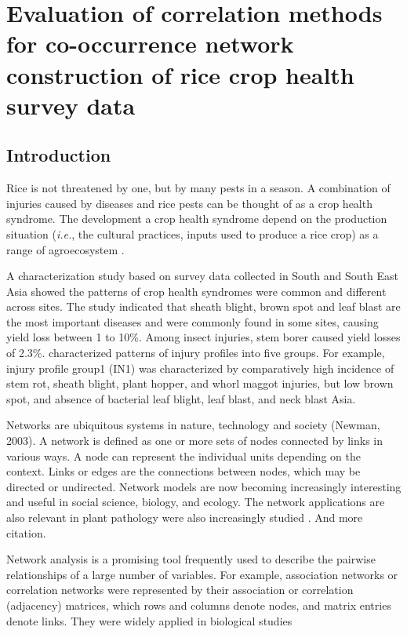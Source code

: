 \section{Evaluation of correlation methods for co-occurrence network construction of rice crop health survey data}

\subsection{Introduction}

Rice is not threatened by one, but by many pests in a season. A combination of injuries caused by diseases and rice pests can be thought of as a crop health syndrome. The development a crop health syndrome depend on the production situation (\textit{i.e.}, the cultural practices, inputs used to produce a rice crop) as a range of agroecosystem \citep{Savary_2006_Quantification}.

A characterization study based on survey data collected in South and South East Asia \citep{Savary_2000_Characterization} showed the patterns of crop health syndromes were common and different across sites. The study indicated that sheath blight, brown spot and leaf blast are the most important diseases and were commonly found in some sites, causing yield loss between 1 to 10\%. Among insect injuries, stem borer caused yield losses of 2.3\%. \citep{Savary_2000_Characterization} characterized patterns of injury profiles into five groups. For example, injury profile group1 (IN1) was characterized by comparatively high incidence of stem rot, sheath blight, plant hopper, and whorl maggot injuries, but low brown spot, and absence of bacterial leaf blight, leaf blast, and neck blast Asia.

Networks are ubiquitous systems in nature, technology and society (Newman, 2003). A network is defined as one or more sets of nodes connected by links in various ways. A node can represent the individual units depending on the context. Links or edges are the connections between nodes, which may be directed or undirected. Network models are now becoming increasingly interesting and useful in social science, biology, and ecology. The network applications  are also relevant in plant pathology were also increasingly studied \citep{Moslonka_Lefebvre_2011}. And more citation.

Network analysis is a promising tool frequently used to describe the pairwise relationships of a large number of variables. For example, association networks or correlation networks were represented by their association or correlation (adjacency) matrices, which rows and columns denote nodes, and matrix entries denote links. They were widely applied in biological studies \citep{Toubiana_2013_Net, Barabasi_2004_Network}


